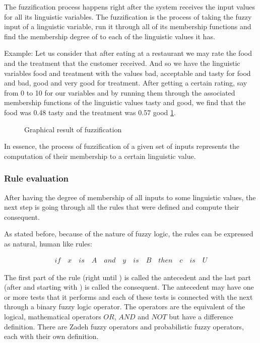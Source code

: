 \qquad The fuzzification process happens right after the system receives the input values for all its
linguistic variables. The fuzzification is the process of taking the fuzzy input of a linguistic variable,
run it through all of its membership functions and find the membership degree of to each of the linguistic
values it has.

Example: Let us consider that after eating at a restaurant we may rate the food and the treatment that the
customer received. And so we have the linguistic variables food and treatment with the values bad, acceptable
and tasty for food and bad, good and very good for treatment. After getting a certain rating, say from 0 to 10
for our variables and by running them through the associated membership functions of the linguistic values
tasty and good, we find that the food was 0.48 tasty and the treatment was 0.57 good \ref{fig:fuzzify}.

\begin{figure}[h!]
    \centerline{}
    \centerline{}
    \caption[Graphical result of fuzzification]{Graphical result of fuzzification}
\label{fig:fuzzify}
\end{figure}

\qquad In essence, the process of fuzzification of a given set of inputs represents the computation of their
membership to a certain linguistic value.


\subsubsection{Rule evaluation}

\qquad After having the degree of membership of all inputs to some linguistic values, the next step is going
through all the rules that were defined and compute their consequent.

\qquad As stated before, because of the nature of fuzzy logic, the rules can be expressed as natural, human
like rules:

\begin{align}
if \quad x \quad is \quad A \quad and \quad y \quad is \quad B \quad then \quad c \quad is \quad U
\end{align}

The first part of the rule (right until ) is called the antecedent and the last part (after and
starting with ) is called the consequent. The antecedent may have one or more tests that it performs
and each of these tests is connected with the next through a binary fuzzy logic operator. The operators are
the equivalent of the logical, mathematical operators $OR$, $AND$ and $NOT$ but have a difference definition.
There are Zadeh fuzzy operators and probabilistic fuzzy operators, each with their own definition.

